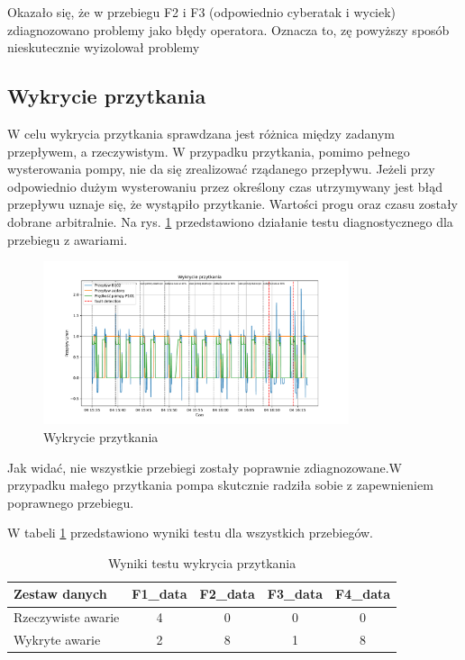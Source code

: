 \documentclass[a4paper,12pt]{article}
\begin{document}
Okazało się, że w przebiegu F2 i F3 (odpowiednio cyberatak i wyciek) zdiagnozowano problemy jako błędy operatora. Oznacza to, zę powyższy sposób nieskutecznie wyizolował problemy

\subsection{Wykrycie przytkania}

W celu wykrycia przytkania sprawdzana jest różnica między zadanym przepływem, a rzeczywistym. W przypadku przytkania, pomimo pełnego wysterowania pompy, nie da się zrealizować rządanego przepływu. Jeżeli przy odpowiednio dużym wysterowaniu przez określony czas utrzymywany jest błąd przepływu uznaje się, że wystąpiło przytkanie. Wartości progu oraz czasu zostały dobrane arbitralnie. Na rys. \ref{fig:zatkanie3} przedstawiono działanie testu diagnostycznego dla przebiegu z awariami.

\begin{figure}[H]
        \centering
        \includegraphics[width=0.8\textwidth]{clogging_detection.pdf}
        \caption{Wykrycie przytkania}
        \label{fig:zatkanie3}
\end{figure}

Jak widać, nie wszystkie przebiegi zostały poprawnie zdiagnozowane.W przypadku małego przytkania pompa skutcznie radziła sobie z zapewnieniem poprawnego przebiegu.

W tabeli \ref{tab:zatkanie2} przedstawiono wyniki testu dla wszystkich przebiegów.

\begin{table}[H]
\centering
\caption{Wyniki testu wykrycia przytkania}
\begin{tabular}{lcccc}
\toprule
Zestaw danych & F1\_data & F2\_data & F3\_data & F4\_data\\
\midrule
Rzeczywiste awarie & 4 & 0 & 0 & 0\\
Wykryte awarie & 2 & 8 & 1 & 8\\
\bottomrule
\end{tabular}
\label{tab:zatkanie2}
\end{table}
\end{document}
